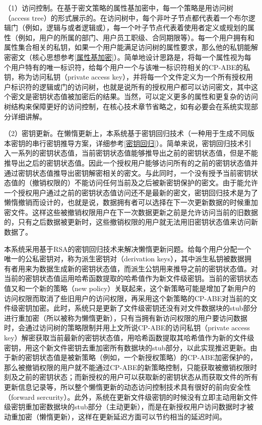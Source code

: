 \documentclass[promaster]{thesis-uestc}
\begin{document}
（1）访问控制。在基于密文策略的属性基加密中，每一个策略是用访问树（access tree）的形式展示的。在访问树中，每个非叶子节点都代表着一个布尔逻辑门（例如，逻辑与或者逻辑或），每一个叶子节点代表着使用者定义或规划的属性（例如，用户的所属的部门、用户员工职级、合同期限等）。每一个用户拥有和属性集合相关的私钥，如果一个用户能满足访问树的属性要求，那么他的私钥能解密密文（核心思想参考\ref{属性基加密}）。简单地设计思路是，将每一个属性视为每个用户特有的唯一标识符，给每个用户一个与该唯一标识符相关的CP-ABE的私钥，称为访问私钥（private access key），并将每一个文件定义为一个所有授权用户标识符的逻辑或门的访问树，也就是说所有的授权用户都可以访问密文，其中这个密文是密钥状态值被加密后的结果。当然，可以定义更多的属性和更复杂的访问树结构来保障更好的访问控制，在核心技术章节省略之，如有必要会在系统实现部分详细讲解。

（2）密钥更新。在懒惰更新上，本系统基于密钥回归技术（一种用于生成不同版本密钥的串行密钥推导方案，详细参考\ref{密钥回归}）。简单来说，密钥回归技术引入一系列的密钥状态值，当前密钥状态值能够推导出之前的密钥状态值，但是不能推导出之后的密钥状态值。因此一个授权用户能够访问所有的之前的密钥状态值并通过密钥状态值推导出密钥解密相关的密文。与此同时，一个没有授予当前密钥状态值的（撤销权限的）不能访问任何当前及之后被新密钥保护的密文。由于能允许一个授权用户通过之前的密钥状态值访问还不是最新的密文，密钥回归技术是为了懒惰撤销而设计的，也就是说，数据拥有者可以选择在下一次更新数据的时候重加密文件。这样这些被撤销权限用户在下一次数据更新之前是允许访问当前的旧数据的，只有之后数据被更新时，这些撤销权限的用户就无法用旧密钥状态值来访问新数据了。

本系统采用基于RSA的密钥回归技术来解决懒惰更新问题。给每个用户分配一个唯一的公私密钥对，称为派生密钥对（derivation keys），其中派生私钥被数据拥有者用来为数据生成新的密钥状态值，而派生公钥用来推导之前的密钥状态值。对当前的密钥状态值运用哈希函数提取的哈希值作为新文件级密钥。当前的密钥状态值又和一个新的策略（new policy）关联起来，这个新策略可能是增加了新用户的访问权限而取消了些旧用户的访问权限，再采用这个新策略的CP-ABE对当前的文件级密钥加密。此时，系统只是更新了文件级密钥还没有对文件数据块的stub部分进行重加密（所以被称为懒惰更新），只有当拥有新访问权限的用户要访问数据时，会通过访问树的策略限制并用上文所说CP-ABE的访问私钥（private access key）解密获取当前最新的密钥状态值，用哈希函数提取其哈希值作为新的文件级密钥，用这个新文件密钥去重加密所有数据块的stub部分，以此实现推迟更新。由于新的密钥状态值是被新策略（例如，一个新授权策略）的CP-ABE加密保护的，那么被撤销权限的用户就不能通过CP-ABE的新策略控制，只能获取被撤销权限时刻及之前的密钥状态；而新授权的用户可以获取新的密钥状态从而获取文件的所有更新信息记录等，所以整个懒惰更新的动态访问控制技术具有很好的前向安全性（forward sercurity）。此外，系统在更新文件级密钥的时候没有立即主动用新文件级密钥重加密数据块的stub部分（主动更新），而是在新授权用户访问数据时才被动重加密（懒惰更新），这样在更新延迟方面可以节约相当的延迟时间。
\end{document}
